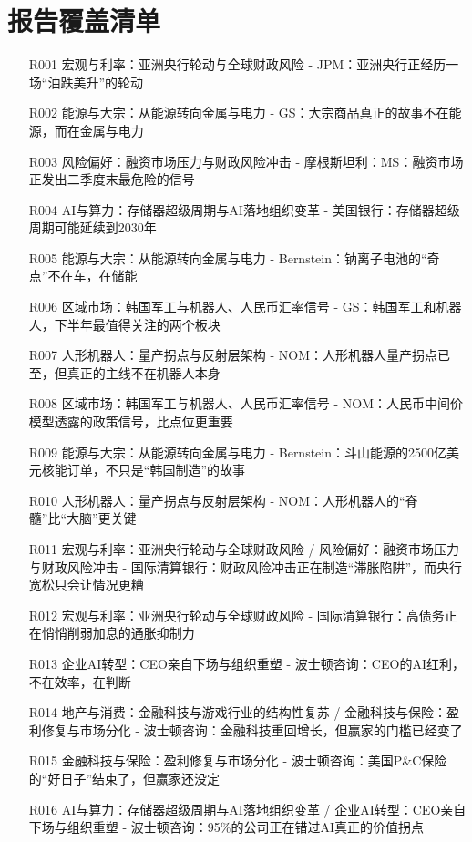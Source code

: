 \documentclass[11pt]{ctexart}
\begin{document}
\section{报告覆盖清单}
\begin{itemize}
  \item [R001] 宏观与利率：亚洲央行轮动与全球财政风险 - JPM：亚洲央行正经历一场“油跌美升”的轮动
  \item [R002] 能源与大宗：从能源转向金属与电力 - GS：大宗商品真正的故事不在能源，而在金属与电力
  \item [R003] 风险偏好：融资市场压力与财政风险冲击 - 摩根斯坦利：MS：融资市场正发出二季度末最危险的信号
  \item [R004] AI与算力：存储器超级周期与AI落地组织变革 - 美国银行：存储器超级周期可能延续到2030年
  \item [R005] 能源与大宗：从能源转向金属与电力 - Bernstein：钠离子电池的“奇点”不在车，在储能
  \item [R006] 区域市场：韩国军工与机器人、人民币汇率信号 - GS：韩国军工和机器人，下半年最值得关注的两个板块
  \item [R007] 人形机器人：量产拐点与反射层架构 - NOM：人形机器人量产拐点已至，但真正的主线不在机器人本身
  \item [R008] 区域市场：韩国军工与机器人、人民币汇率信号 - NOM：人民币中间价模型透露的政策信号，比点位更重要
  \item [R009] 能源与大宗：从能源转向金属与电力 - Bernstein：斗山能源的2500亿美元核能订单，不只是“韩国制造”的故事
  \item [R010] 人形机器人：量产拐点与反射层架构 - NOM：人形机器人的“脊髓”比“大脑”更关键
  \item [R011] 宏观与利率：亚洲央行轮动与全球财政风险 / 风险偏好：融资市场压力与财政风险冲击 - 国际清算银行：财政风险冲击正在制造“滞胀陷阱”，而央行宽松只会让情况更糟
  \item [R012] 宏观与利率：亚洲央行轮动与全球财政风险 - 国际清算银行：高债务正在悄悄削弱加息的通胀抑制力
  \item [R013] 企业AI转型：CEO亲自下场与组织重塑 - 波士顿咨询：CEO的AI红利，不在效率，在判断
  \item [R014] 地产与消费：金融科技与游戏行业的结构性复苏 / 金融科技与保险：盈利修复与市场分化 - 波士顿咨询：金融科技重回增长，但赢家的门槛已经变了
  \item [R015] 金融科技与保险：盈利修复与市场分化 - 波士顿咨询：美国P\&C保险的“好日子”结束了，但赢家还没定
  \item [R016] AI与算力：存储器超级周期与AI落地组织变革 / 企业AI转型：CEO亲自下场与组织重塑 - 波士顿咨询：95\%的公司正在错过AI真正的价值拐点

\end{itemize}
\end{document}
